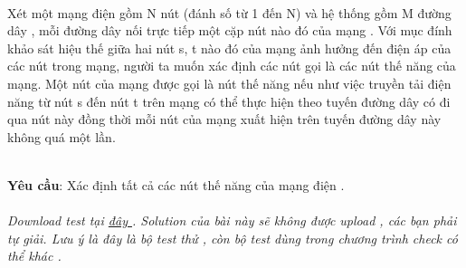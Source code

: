  

Xét một mạng điện gồm N nút (đánh số từ 1 đến N) và hệ thống gồm M đường dây , mỗi đường dây nối trực tiếp một cặp nút nào đó của mạng . Với mục đính khảo sát hiệu thế giữa hai nút s, t nào đó của mạng ảnh hưởng đến điện áp của các nút trong mạng, người ta muốn xác định các nút gọi là các nút thế năng của mạng. Một nút của mạng được gọi là nút thế năng nếu như việc truyền tải điện năng từ nút s đến nút t trên mạng có thể thực hiện theo tuyến đường dây có đi qua nút này đồng thời mỗi nút của mạng xuất hiện trên tuyến đường dây này không quá một lần.


\\\textbf{Yêu cầu}: Xác định tất cả các nút thế năng của mạng điện .
\\
\\\emph{Download test tại \href{http://vn.spoj.pl/content/ENET.rar}{ đây } . Solution của bài này sẽ không được upload , các bạn phải tự giải. Lưu ý là đây là bộ test thử , còn bộ test dùng trong chương trình check có thể khác . }